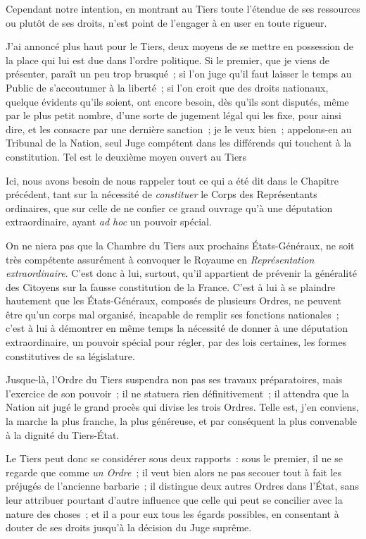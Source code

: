 \documentclass[french,twoside]{book} %
\begin{document}
Cependant notre intention, en montrant au Tiers toute l’étendue de ses ressources ou plutôt de ses droits, n’est point de l’engager à en user en toute rigueur.\par
J’ai annoncé plus haut pour le Tiers, deux moyens de se mettre en possession de la place qui lui est due dans l’ordre politique. Si le premier, que je viens de présenter, paraît un peu trop brusqué ; si l’on juge qu’il faut laisser le temps au Public de s’accoutumer à la liberté ; si l’on croit que des droits nationaux, quelque évidents qu’ils soient, ont encore besoin, dès qu’ils sont disputés, même par le plus petit nombre, d’une sorte de jugement légal qui les fixe, pour ainsi dire, et les consacre par une dernière sanction ; je le veux bien ; appelons-en au Tribunal de la Nation, seul Juge compétent dans les différends qui touchent à la constitution. Tel est le deuxième moyen ouvert au Tiers\par
Ici, nous avons besoin de nous rappeler tout ce qui a été dit dans le Chapitre précédent, tant sur la nécessité de {\itshape constituer} le Corps des Représentants ordinaires, que sur celle de ne confier ce grand ouvrage qu’à une députation extraordinaire, ayant {\itshape ad hoc} un pouvoir spécial.\par
On ne niera pas que la Chambre du Tiers aux prochains États-Généraux, ne soit très compétente assurément à convoquer le Royaume en {\itshape Représentation extraordinaire}. C’est donc à lui, surtout, qu’il appartient de prévenir la généralité des Citoyens sur la fausse constitution de la France. C’est à lui à se plaindre hautement que les États-Généraux, composés de plusieurs Ordres, ne peuvent être qu’un corps mal organisé, incapable de remplir ses fonctions nationales ; c’est à lui à démontrer en même temps la nécessité de donner à une députation extraordinaire, un pouvoir spécial pour régler, par des lois certaines, les formes constitutives de sa législature.\par
Jusque-là, l’Ordre du Tiers suspendra non pas ses travaux préparatoires, mais l’exercice de son pouvoir ; il ne statuera rien définitivement ; il attendra que la Nation ait jugé le grand procès qui divise les trois Ordres. Telle est, j’en conviens, la marche la plus franche, la plus généreuse, et par conséquent la plus convenable à la dignité du Tiers-État.\par
Le Tiers peut donc se considérer sous deux rapports : sous le premier, il ne se regarde que comme {\itshape un Ordre} ; il veut bien alors ne pas secouer tout à fait les préjugés de l’ancienne barbarie ; il distingue deux autres Ordres dans l’État, sans leur attribuer pourtant d’autre influence que celle qui peut se concilier avec la nature des choses ; et il a pour eux tous les égards possibles, en consentant à douter de ses droits jusqu’à la décision du Juge suprême.\par
\end{document}
